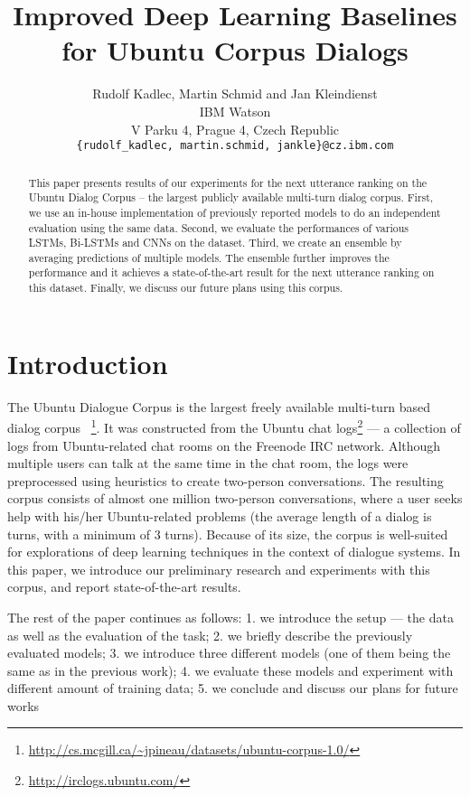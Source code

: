 \documentclass{article} \usepackage{nips15submit_e,times}
\title{Improved Deep Learning Baselines for Ubuntu Corpus Dialogs}
\author{
Rudolf Kadlec, Martin Schmid and Jan Kleindienst \\
IBM Watson\\
V Parku 4, Prague 4, Czech Republic\\
\texttt{\{rudolf\_kadlec, martin.schmid, jankle\}@cz.ibm.com} \\
}
\newcommand{\MARTINSECOND}[1]{{\color{black}#1}} \newcommand{\MARTINTHIRD}[1]{{\color{black}#1}} \newcommand{\COPY}[1]{{\color{black}[#1]}}
\begin{document}
\maketitle

\begin{abstract}
\MARTINSECOND{
This paper presents results of our experiments for the next utterance ranking on the Ubuntu Dialog Corpus -- the largest publicly available multi-turn dialog corpus.
First, we use an in-house implementation of previously reported models to do an independent evaluation using the same data.
Second, we evaluate the performances of various LSTMs, Bi-LSTMs and CNNs on the dataset.
Third, we create an ensemble by averaging predictions of multiple models. The ensemble further improves the performance and it achieves a state-of-the-art result for the next utterance ranking on this dataset.
Finally, we discuss our future plans using this corpus.
}
\end{abstract}


\section{Introduction}



\MARTINSECOND
{
The Ubuntu Dialogue Corpus is the largest freely available multi-turn based dialog corpus ~\cite{lowe2015ubuntu}\footnote{\url{http://cs.mcgill.ca/~jpineau/datasets/ubuntu-corpus-1.0/}}.
It was constructed from the Ubuntu chat logs\footnote{\url{http://irclogs.ubuntu.com/}} --- a collection of logs from Ubuntu-related chat rooms on the Freenode IRC network.
Although multiple users can talk at the same time in the chat room, the logs were preprocessed using heuristics to create two-person conversations.
The resulting corpus consists of almost one million two-person conversations, where a user seeks help with his/her Ubuntu-related problems
(the average length of a dialog is  turns, with a minimum of 3 turns).
Because of its size, the corpus is well-suited for explorations of deep learning techniques in the context of dialogue systems.
In this paper, we introduce our preliminary research and experiments with this corpus, and report state-of-the-art results.

The rest of the paper continues as follows: 
1. we introduce the setup --- the data as well as the evaluation of the task;
2. we briefly describe the previously evaluated  models;
3. we introduce three different models (one of them being the same as in the previous work);
4. we evaluate these models and experiment with different amount of training data;
5. we conclude and discuss our plans for future works
}
\end{document}

